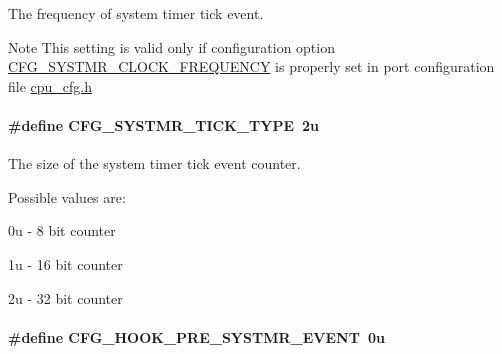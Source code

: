 The frequency of system timer tick event. 

\begin{DoxyNote}{Note}
This setting is valid only if configuration option \hyperlink{group__template__cpu__cfg_gac85c592962ba2c968d13f867533196a1}{C\-F\-G\-\_\-\-S\-Y\-S\-T\-M\-R\-\_\-\-C\-L\-O\-C\-K\-\_\-\-F\-R\-E\-Q\-U\-E\-N\-C\-Y} is properly set in port configuration file \hyperlink{cpu__cfg_8h}{cpu\-\_\-cfg.\-h} 
\end{DoxyNote}
\hypertarget{group__kern__cfg_gad69eef523459c5ab485ce2f62bddceca}{
\paragraph[{C\-F\-G\-\_\-\-S\-Y\-S\-T\-M\-R\-\_\-\-T\-I\-C\-K\-\_\-\-T\-Y\-P\-E}]{\setlength{\rightskip}{0pt plus 5cm}\#define C\-F\-G\-\_\-\-S\-Y\-S\-T\-M\-R\-\_\-\-T\-I\-C\-K\-\_\-\-T\-Y\-P\-E~2u}}\label{group__kern__cfg_gad69eef523459c5ab485ce2f62bddceca}


The size of the system timer tick event counter. 

Possible values are\-:
\begin{DoxyItemize}
\item 0u -\/ 8 bit counter
\item 1u -\/ 16 bit counter
\item 2u -\/ 32 bit counter 
\end{DoxyItemize}\hypertarget{group__kern__cfg_gaa130bc9f72010b44b4b06618d8f8d0bc}{
\paragraph[{C\-F\-G\-\_\-\-H\-O\-O\-K\-\_\-\-P\-R\-E\-\_\-\-S\-Y\-S\-T\-M\-R\-\_\-\-E\-V\-E\-N\-T}]{\setlength{\rightskip}{0pt plus 5cm}\#define C\-F\-G\-\_\-\-H\-O\-O\-K\-\_\-\-P\-R\-E\-\_\-\-S\-Y\-S\-T\-M\-R\-\_\-\-E\-V\-E\-N\-T~0u}}\label{group__kern__cfg_gaa130bc9f72010b44b4b06618d8f8d0bc}


